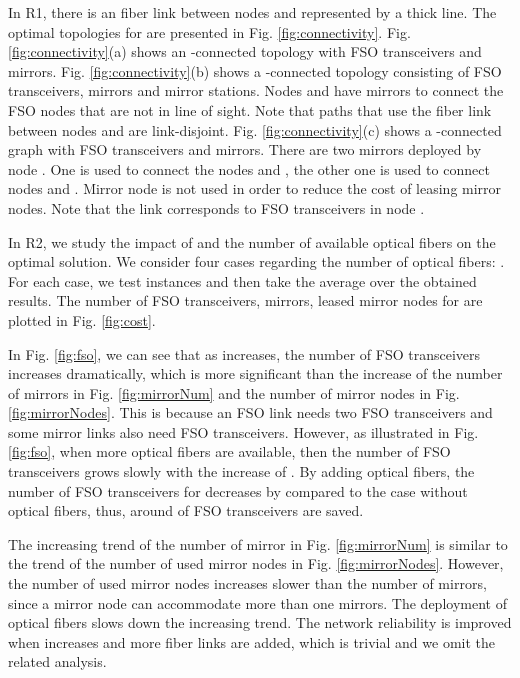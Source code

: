 \documentclass[onecolumn,11pt,draftclsnofoot]{IEEEtran}
\begin{document}
In R1, there is an fiber link between nodes  and  represented by a thick line. The optimal topologies for  are presented in Fig. \eqref{fig:connectivity}. Fig. \eqref{fig:connectivity}(a) shows an -connected topology with  FSO transceivers and  mirrors. Fig. \eqref{fig:connectivity}(b) shows a -connected topology consisting of  FSO transceivers,  mirrors and  mirror stations.
Nodes  and  have mirrors to connect the FSO nodes that are not in line of sight. Note that paths that use the fiber link between nodes  and  are link-disjoint. Fig. \eqref{fig:connectivity}(c) shows a -connected graph with  FSO transceivers and  mirrors. There are two mirrors deployed by node . One is used to connect the nodes  and , the other one is used to connect nodes  and . Mirror node  is not used in order to reduce the cost of leasing mirror nodes. Note that the link  corresponds to  FSO transceivers in node .

In R2, we study the impact of  and the number of available optical fibers on the optimal solution. We consider four cases regarding the number of optical fibers: . For each case, we test  instances and then take the average over the obtained results. The number of FSO transceivers, mirrors, leased mirror nodes for  are plotted in Fig. \ref{fig:cost}.

In Fig. \ref{fig:fso}, we can see that as  increases, the number of FSO transceivers increases dramatically, which is more significant than the increase of the number of mirrors in Fig. \ref{fig:mirrorNum} and the number of mirror nodes in Fig. \ref{fig:mirrorNodes}. This is because an FSO link needs two FSO transceivers and some mirror links also need FSO transceivers. However, as illustrated in Fig. \ref{fig:fso}, when more optical fibers are available, then the number of FSO transceivers grows slowly with the increase of . By adding  optical fibers, the number of FSO transceivers for  decreases by  compared to the case without optical fibers, thus, around  of FSO transceivers are saved.

The increasing trend of the number of mirror in Fig. \ref{fig:mirrorNum} is similar to the trend of the number of used mirror nodes in Fig. \ref{fig:mirrorNodes}. However, the number of used mirror nodes increases slower than the number of mirrors, since a mirror node can accommodate more than one mirrors. The deployment of optical fibers slows down the increasing trend. The network reliability is improved when  increases and more fiber links are added, which is trivial and we omit the related analysis.
\end{document}
